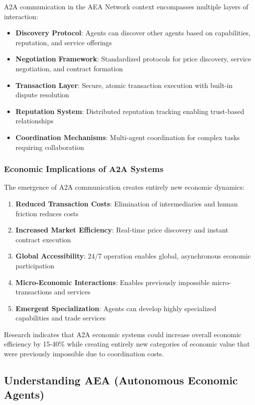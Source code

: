 \documentclass[12pt,a4paper]{article}
\begin{document}
A2A communication in the AEA Network context encompasses multiple layers of interaction:

\begin{itemize}
\item \textbf{Discovery Protocol}: Agents can discover other agents based on capabilities, reputation, and service offerings
\item \textbf{Negotiation Framework}: Standardized protocols for price discovery, service negotiation, and contract formation
\item \textbf{Transaction Layer}: Secure, atomic transaction execution with built-in dispute resolution
\item \textbf{Reputation System}: Distributed reputation tracking enabling trust-based relationships
\item \textbf{Coordination Mechanisms}: Multi-agent coordination for complex tasks requiring collaboration
\end{itemize}

\subsubsection{Economic Implications of A2A Systems}

The emergence of A2A communication creates entirely new economic dynamics:

\begin{enumerate}
\item \textbf{Reduced Transaction Costs}: Elimination of intermediaries and human friction reduces costs
\item \textbf{Increased Market Efficiency}: Real-time price discovery and instant contract execution
\item \textbf{Global Accessibility}: 24/7 operation enables global, asynchronous economic participation
\item \textbf{Micro-Economic Interactions}: Enables previously impossible micro-transactions and services
\item \textbf{Emergent Specialization}: Agents can develop highly specialized capabilities and trade services
\end{enumerate}

Research indicates that A2A economic systems could increase overall economic efficiency by 15-40\% while creating entirely new categories of economic value that were previously impossible due to coordination costs.

\subsection{Understanding AEA (Autonomous Economic Agents)}
\end{document}

